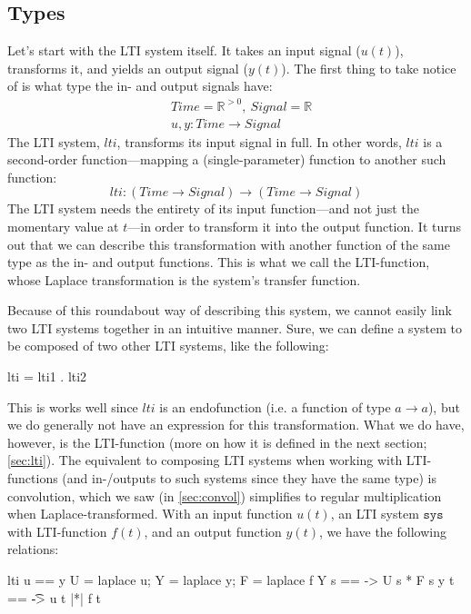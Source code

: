 \subsection{Types}\label{sec:tftypes}
Let's start with the LTI system itself. It takes an input signal ($u(t)$), transforms it, and yields an output signal ($y(t)$). The first thing to take notice of is what type the in- and output signals have:
\begin{align*}
    &Time = \mathbb{R}^{>0},~ Signal = \mathbb{R} \\
    &u, y : Time \rightarrow Signal
\end{align*}
The LTI system, $lti$, transforms its input signal in full. In other words, $lti$ is a second-order function---mapping a (single-parameter) function to another such function:
\begin{equation*}
    lti : (Time \rightarrow Signal) \rightarrow (Time \rightarrow Signal)
\end{equation*}
The LTI system needs the entirety of its input function---and not just the momentary value at $t$---in order to transform it into the output function.
It turns out that we can describe this transformation with another function of the same type as the in- and output functions. This is what we call the LTI-function, whose Laplace transformation is the system's transfer function.

Because of this roundabout way of describing this system, we cannot easily link two LTI systems together in an intuitive manner. Sure, we can define a system to be composed of two other LTI systems, like the following: 
\begin{codeeq}
lti = lti1 . lti2
\end{codeeq}
This is works well since $lti$ is an endofunction (i.e. a function of type $a\rightarrow a$), but we do generally not have an expression for this transformation. What we do have, however, is the LTI-function (more on how it is defined in the next section; \ref{sec:lti}). The equivalent to composing LTI systems when working with LTI-functions (and in-/outputs to such systems since they have the same type) is convolution, which we saw (in \ref{sec:convol}) simplifies to regular multiplication when Laplace-transformed.
With an input function $u(t)$, an LTI system $\texttt{sys}$ with LTI-function $f(t)$, and an output function $y(t)$, we have the following relations:
\begin{codeeq}
lti u == y
U = laplace u; Y = laplace y; F = laplace f
Y s == \s -> U s * F s
y t == \t -> u t |*| f t
\end{codeeq}


